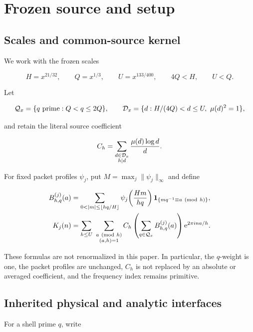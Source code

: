 \section{Frozen source and setup}
\label{sec:source}

\subsection{Scales and common-source kernel}

We work with the frozen scales

\begin{equation}
 H=x^{21/32},\qquad Q=x^{1/3},\qquad U=x^{133/400},
 \qquad 4Q<H,\qquad U<Q.
 \label{eq:scales}
\end{equation}

Let

\[
 \mathcal Q_x=\{q\text{ prime}:Q<q\leq2Q\},
 \qquad
 \mathcal D_x=\{d:H/(4Q)<d\leq U,\ \mu(d)^2=1\},
\]

and retain the literal source coefficient

\begin{equation}
 C_h=\sum_{\substack{d\in\mathcal D_x\\h\mid d}}\frac{\mu(d)\log d}{d}.
 \label{eq:Ch}
\end{equation}

For fixed packet profiles $\psi_j$, put
$M=\max_j\lVert\psi_j\rVert_\infty$ and define

\begin{align}
 B_{h,q}^{(j)}(a)
 &=\sum_{0<|m|\leq\lfloor hq/H\rfloor}
   \psi_j\!\left(\frac{Hm}{hq}\right)
   \one_{\{mq^{-1}\equiv a\ (\mathrm{mod}\ h)\}},
 \label{eq:B}\\
 K_j(n)
 &=\sum_{h\leq U}\ \sum_{\substack{a\ (\mathrm{mod}\ h)\\(a,h)=1}}
   C_h\left(\sum_{q\in\Qx}B_{h,q}^{(j)}(a)\right)
   \ee^{2\pi i n a/h}.
 \label{eq:K}
\end{align}

These formulas are not renormalized in this paper.  In particular, the
$q$-weight is one, the packet profiles are unchanged, $C_h$ is not replaced
by an absolute or averaged coefficient, and the frequency index remains
primitive.

\subsection{Inherited physical and analytic interfaces}

For a shell prime $q$, write

